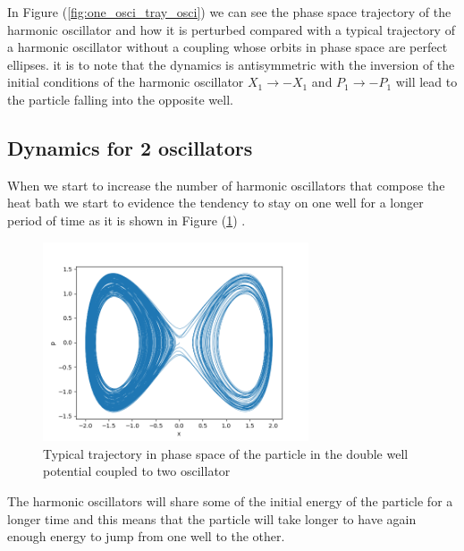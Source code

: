 In Figure (\ref{fig:one_osci_tray_osci}) we can see the phase space trajectory of the harmonic oscillator and how it is perturbed compared with a typical trajectory of  a harmonic oscillator without a coupling whose orbits in phase space are perfect ellipses. it is to note that the dynamics is antisymmetric with the inversion of the initial conditions of the harmonic oscillator $X_1\rightarrow -X_1$ and $P_1 \rightarrow -P_1$ will lead to the particle falling into the opposite well.


\subsection{Dynamics for 2 oscillators}
When we start to increase the number of harmonic oscillators that compose the heat bath we start to evidence the tendency to stay on one well for a longer period of time as it is shown in Figure (\ref{fig:two_osci_tray}) .

\begin{figure}[H]
\centering
\includegraphics[width=0.7\textwidth]{Figures/two_osci_tray.png}
\caption{Typical trajectory in phase space of the particle in the double well potential coupled to two oscillator 
}
\label{fig:two_osci_tray}
\end{figure} 

The harmonic oscillators will share some of the initial energy of the particle for a longer time and  this means that the particle will take longer to have again enough energy to jump from one well to the other. 



